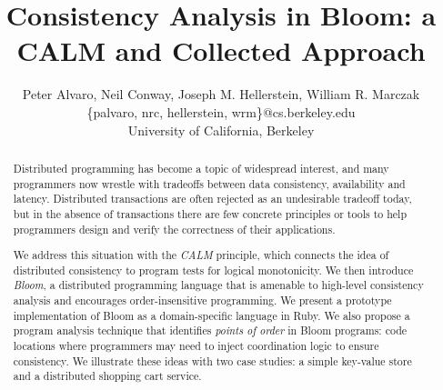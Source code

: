 \documentclass{sig-alternate}
\begin{document}
\title{Consistency Analysis in Bloom: a CALM and Collected Approach}

\author{
Peter Alvaro, Neil Conway, Joseph M. Hellerstein, William R. Marczak \vspace{12pt} \\
\{palvaro, nrc, hellerstein, wrm\}@cs.berkeley.edu \\
University of California, Berkeley
}

\maketitle

\begin{abstract}
  Distributed programming has become a topic of widespread interest, and many
  programmers now wrestle with tradeoffs between data consistency, availability
  and latency.  Distributed transactions are often rejected as an undesirable
  tradeoff today, but in the absence of transactions there are few concrete
  principles or tools to help programmers design and verify the correctness of
  their applications.

  We address this situation with the \emph{CALM} principle, which connects the
  idea of distributed consistency to program tests for logical monotonicity.  We
  then introduce \emph{Bloom}, a distributed programming language that is
  amenable to high-level consistency analysis and encourages order-insensitive
  programming.  We present a prototype implementation of Bloom as a
  domain-specific language in Ruby. We also propose a program analysis technique
  that identifies {\em points of order} in Bloom programs: code locations where
  programmers may need to inject coordination logic to ensure consistency.  We
  illustrate these ideas with two case studies: a simple key-value store and a
  distributed shopping cart service.
\end{abstract}














\newpage
\appendix

\end{document}
